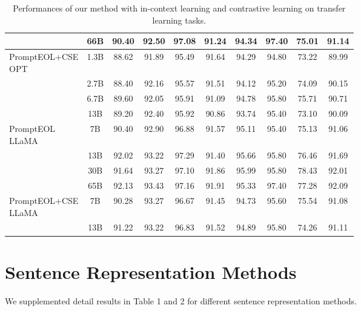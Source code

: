 \documentclass{article}
\begin{document}
\begin{table}[h]
{\begin{tabular}{lccccccccc}
 &  66B  & 90.40 & 92.50 & 97.08 & 91.24 & 94.34 & 97.40 & 75.01 & 91.14\\
\midrule
\multirowcell{4}[0pt][l]{PromptEOL+CSE\\OPT}
 &  1.3B& 88.62 & 91.89 & 95.49 & 91.64 & 94.29 & 94.80 & 73.22 & 89.99 \\
 &  2.7B& 88.40 & 92.16 & 95.57 & 91.51 & 94.12 & 95.20 & 74.09 & 90.15 \\
 &  6.7B& 89.60 & 92.05 & 95.91 & 91.09 & 94.78 & 95.80 & 75.71 & 90.71 \\
 &  13B & 89.20 & 92.40 & 95.92 & 90.86 & 93.74 & 95.40 & 73.10 & 90.09 \\
\midrule
\multirowcell{4}[0pt][l]{PromptEOL\\LLaMA}
& 7B & 90.40 & 92.90 & 96.88 & 91.57 & 95.11 & 95.40 & 75.13 & 91.06 \\
& 13B & 92.02 & 93.22 & 97.29 & 91.40 & 95.66 & 95.80 & 76.46 & 91.69 \\
& 30B & 91.64 & 93.27 & 97.10 & 91.86 & 95.99 & 95.80 & 78.43 & 92.01 \\
& 65B & 92.13 & 93.43 & 97.16 & 91.91 & 95.33 & 97.40 & 77.28 & 92.09 \\
\midrule
\multirowcell{2}[0pt][l]{PromptEOL+CSE\\LLaMA}
& 7B & 90.28 & 93.27 & 96.67 & 91.45 & 94.73 & 95.60 & 75.54 & 91.08 \\
& 13B& 91.22 & 93.22 & 96.83 & 91.52 & 94.89 & 95.80 & 74.26 & 91.11 \\
\bottomrule
\end{tabular}}
\caption{ Performances of our method with in-context learning and contrastive learning on transfer learning tasks.
} \label{fig:transfer_icl_cse}
\end{table}

\newpage

\section{Sentence Representation Methods}\label{apx:sentence_rep}
We supplemented detail results in Table 1 and 2 for different sentence representation methods.
\end{document}
